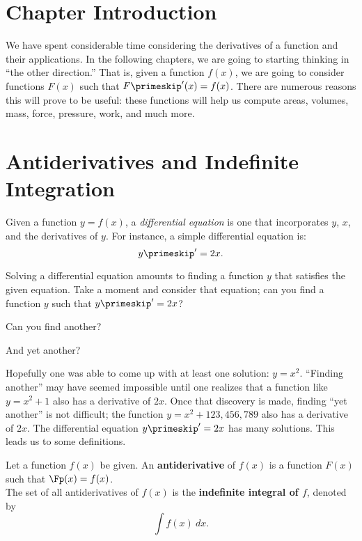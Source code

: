 \iflatexml\section*{Chapter Introduction}\fi

We have spent considerable time considering the derivatives of a function and their applications. In the following chapters, we are going to starting thinking in ``the other direction.'' That is, given a function $f(x)$, we are going to consider functions $F(x)$ such that $F\primeskip'(x) = f(x)$. There are numerous reasons this will prove to be useful: these functions will help us compute areas, volumes, mass, force, pressure, work, and much more.



\section{Antiderivatives and Indefinite Integration}\label{sec:antider}

Given a function $y=f(x)$, a \textit{differential equation} is one that incorporates $y$, $x$, and the derivatives of $y$. For instance, a simple differential equation is: $$y\primeskip' = 2x.$$

Solving a differential equation amounts to finding a function $y$ that satisfies the given equation. Take a moment and consider that equation; can you find a function $y$ such that $y\primeskip' = 2x$?

Can you find another?

And yet another?

Hopefully one was able to come up with at least one solution: $y = x^2$. ``Finding another'' may have seemed impossible until one realizes that a function like $y=x^2+1$ also has a derivative of $2x$. Once that discovery is made, finding ``yet another'' is not difficult; the function $y = x^2 + 123,456,789$ also has a derivative of $2x$. The differential equation $y\primeskip' = 2x$ has many solutions. This leads us to some definitions.

{Let a function $f(x)$ be given. An \textbf{antiderivative} of $f(x)$ is a function $F(x)$ such that $\Fp(x) = f(x)$.\\

The set of all antiderivatives of $f(x)$ is the \textbf{indefinite integral of $f$}, denoted by $$\int f(x) \ dx.$$
}

